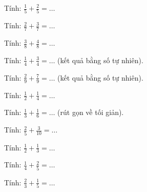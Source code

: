 \begin{ex}
Tính: $\frac{1}{5} + \frac{2}{5} = \dots$
\end{ex}

\begin{ex}
Tính: $\frac{2}{7} + \frac{3}{7} = \dots$
\end{ex}

\begin{ex}
Tính: $\frac{3}{8} + \frac{4}{8} = \dots$
\end{ex}

\begin{ex}
Tính: $\frac{1}{4} + \frac{3}{4} = \dots$ (kết quả bằng số tự nhiên).
\end{ex}

\begin{ex}
Tính: $\frac{2}{9} + \frac{7}{9} = \dots$ (kết quả bằng số tự nhiên).
\end{ex}

\begin{ex}
Tính: $\frac{1}{2} + \frac{1}{4} = \dots$
\end{ex}

\begin{ex}
Tính: $\frac{1}{3} + \frac{1}{6} = \dots$ (rút gọn về tối giản).
\end{ex}

\begin{ex}
Tính: $\frac{2}{5} + \frac{3}{10} = \dots$
\end{ex}

\begin{ex}
Tính: $\frac{1}{2} + \frac{1}{3} = \dots$
\end{ex}

\begin{ex}
Tính: $\frac{1}{4} + \frac{2}{5} = \dots$
\end{ex}

\begin{ex}
Tính: $\frac{2}{3} + \frac{1}{5} = \dots$
\end{ex}

